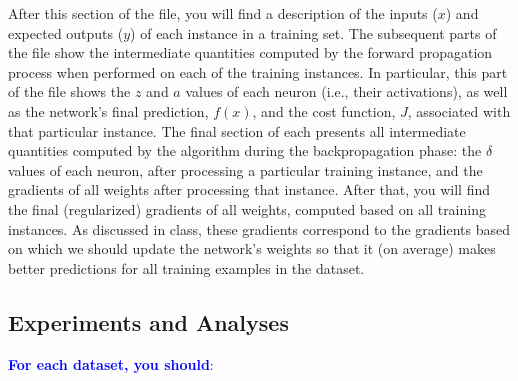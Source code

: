 \documentclass[letterpaper]{article}
\newcommand{\HIGHLIGHT}[1]{\textcolor{blue}{\textbf{#1}}}
\begin{document}
    After this section of the file, you will find a description of the inputs ($x$) and expected outputs ($y$) of each instance in a training set. The subsequent parts of the file show the intermediate quantities computed by the forward propagation process when performed on each of the training instances. In particular, this part of the file shows the $z$ and $a$ values of each neuron (i.e., their activations), as well as the network's final prediction, $f(x)$, and the cost function, $J$, associated with that particular instance. 
    The final section of each presents all intermediate quantities computed by the algorithm during the backpropagation phase: the $\delta$ values of each neuron, after processing a particular training instance, and the gradients of all weights after processing that instance. After that, you will find the final (regularized) gradients of all weights, computed based on all training instances. As discussed in class, these gradients correspond to the gradients based on which we should update the network's weights so that it (on average) makes better predictions for all training examples in the dataset.

\subsection{Experiments and Analyses}

\HIGHLIGHT{For each dataset, you should}:
\end{document}
